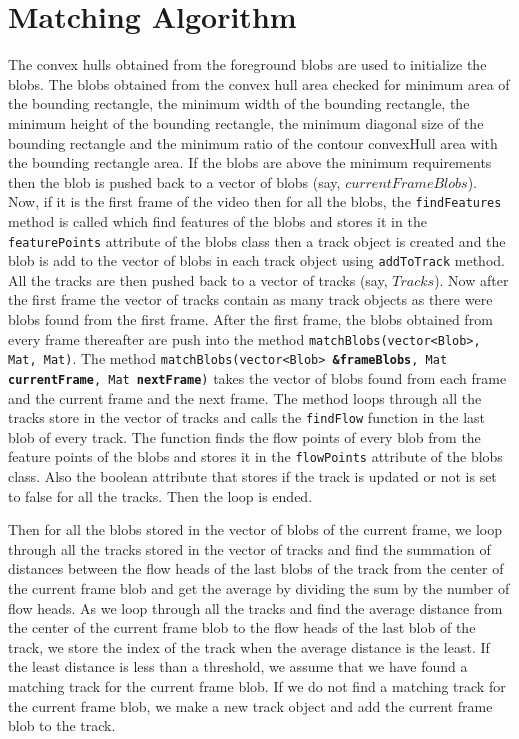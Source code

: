 \documentclass[a4paper]{aitthesis}
\begin{document}
\section{Matching Algorithm}
The convex hulls obtained from the foreground blobs are used to initialize the blobs. The blobs obtained from the convex hull area checked for minimum area of the bounding rectangle, the minimum width of the bounding rectangle, the minimum height of the bounding rectangle, the minimum diagonal size of the bounding rectangle and the minimum ratio of the contour convexHull area with the bounding rectangle area. If the blobs are above the minimum requirements then the blob is pushed back to a vector of blobs (say, $currentFrameBlobs$). Now, if it is the first frame of the video then for all the blobs, the \texttt{findFeatures} method is called which find features of the blobs and stores it in the \texttt{featurePoints} attribute of the blobs class then a track object is created and the blob is add to the vector of blobs in each track object using \texttt{addToTrack} method. All the tracks are then pushed back to a vector of tracks (say, $Tracks$). Now after the first frame the vector of tracks contain as many track objects as there were blobs found from the first frame. After the first frame, the blobs obtained from every frame thereafter are push into the method \texttt{matchBlobs(vector<Blob>, Mat, Mat)}. The method \texttt{matchBlobs(vector<Blob> \textbf{\&frameBlobs}, Mat \textbf{currentFrame}, Mat \textbf{nextFrame})} takes the vector of blobs found from each frame and the current frame and the next frame. The method loops through all the tracks store in the vector of tracks and calls the \texttt{findFlow} function in the last blob of every track. The function finds the flow points of every blob from the feature points of the blobs and stores it in the \texttt{flowPoints} attribute of the blobs class. Also the boolean attribute that stores if the track is updated or not is set to false for all the tracks. Then the loop is ended.

Then for all the blobs stored in the vector of blobs of the current frame, we loop through all the tracks stored in the vector of tracks and find the summation of  distances between the flow heads of the last blobs of the track from the center of the current frame blob and get the average by dividing the sum by the number of flow heads. As we loop through all the tracks and find the average distance from the center of the current frame blob to the flow heads of the last blob of the track, we store the index of the track when the average distance is the least. If the least distance is less than a threshold, we assume that we have found a matching track for the current frame blob. If we do not find a matching track for the current frame blob, we make a new track object and add the current frame blob to the track.
\end{document}
